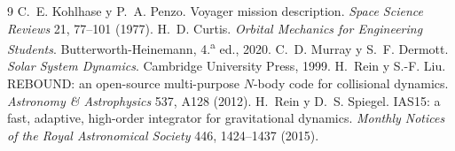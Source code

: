 \documentclass[12pt,letterpaper]{article}
\begin{document}
\begin{thebibliography}{9}
 C.~E. Kohlhase y P.~A. Penzo. Voyager mission description.
\emph{Space Science Reviews} 21, 77--101 (1977).
 H.~D. Curtis. \emph{Orbital Mechanics for Engineering Students}.
Butterworth-Heinemann, 4.\textsuperscript{a} ed., 2020.
 C.~D. Murray y S.~F. Dermott. \emph{Solar System Dynamics}.
Cambridge University Press, 1999.
 H.~Rein y S.-F. Liu. REBOUND: an open-source multi-purpose $N$-body code
for collisional dynamics. \emph{Astronomy \& Astrophysics} 537, A128 (2012).
 H.~Rein y D.~S. Spiegel. IAS15: a fast, adaptive, high-order integrator
for gravitational dynamics. \emph{Monthly Notices of the Royal Astronomical Society} 446,
1424--1437 (2015).
\end{thebibliography}
\end{document}
